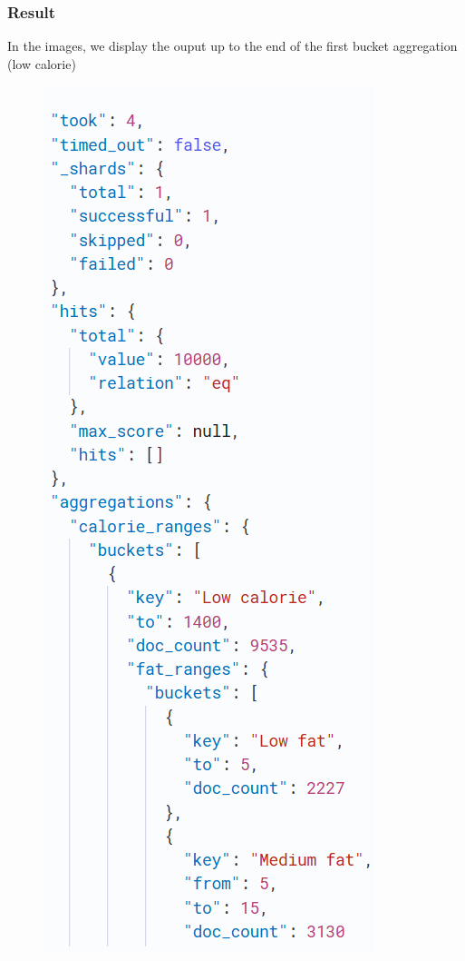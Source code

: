 \begin{enumerate}
    \subsubsection{Result}
    In the images, we display the ouput up to the end of the first bucket aggregation (low calorie)

    \begin{figure}[h!]
    \centering
    \begin{minipage}{0.25\textwidth}
        \centering
        \includegraphics[width=\textwidth]{Report/ReportLatex/Images/ElasticsearchResults/calories1.png}

\end{minipage}
\end{figure}
\end{enumerate}
